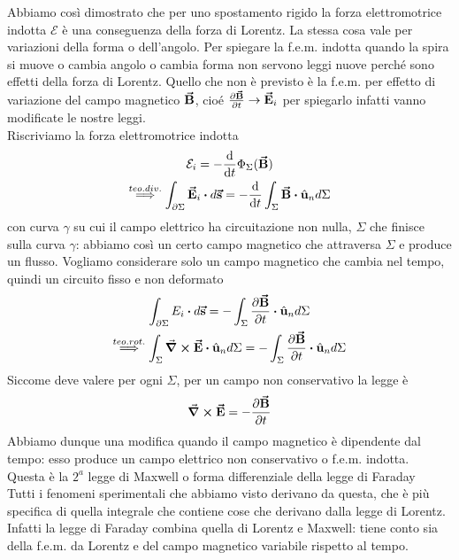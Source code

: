 Abbiamo così dimostrato che per uno spostamento rigido la forza elettromotrice indotta $\mathcal{E}$ è una conseguenza della forza di Lorentz. La stessa cosa vale per variazioni della forma o dell'angolo. Per spiegare la f.e.m. indotta quando la spira si muove o cambia angolo o cambia forma non servono leggi nuove perché sono effetti della forza di Lorentz. Quello che non è previsto è la f.e.m. per effetto di variazione del campo magnetico $\vb*{\va{B}}$, cioé $\pdv{\vb*{\va{B}}}{t}\rightarrow \vb*{\va{E}}_i$ per spiegarlo infatti vanno modificate le nostre leggi.\\
Riscriviamo la forza elettromotrice indotta
\begin{gather*}
	\mathcal{E}_i= -\dv{t}\Phi_\Sigma(\vba B)\\
	\stackrel{teo. div.}{\implies}\int_{\partial\Sigma}\vba E_i\vdot d\vba s=-\dv{t}\int_{\Sigma}\vba B\vdot\vbh u_n d\Sigma
\end{gather*}
con curva $\gamma$ su cui il campo elettrico ha circuitazione non nulla, $\Sigma$ che finisce sulla curva $\gamma$: abbiamo così un certo campo magnetico che attraversa $\Sigma$ e produce un flusso. Vogliamo considerare solo un campo magnetico che cambia nel tempo, quindi un circuito fisso e non deformato
\begin{gather*}
	\int_{\partial\Sigma} E_i\vdot d\vba s =-\int_\Sigma \pdv{\vba B}{t}\vdot\vbh u_n d\Sigma\\
	\stackrel{teo. rot.}{\implies}\int_\Sigma\curl\vba E\vdot\vbh{u}_n d\Sigma=-\int_{\Sigma}\pdv{\vba B}{t}\vdot\vbh u_n d\Sigma
\end{gather*}
Siccome deve valere per ogni $\Sigma$, per un campo non conservativo la legge è 
\begin{equation}
	\curl\vb*{\va{E}}=-\pdv{\vb*{\va{B}}}{t}
\end{equation}	
Abbiamo dunque una modifica quando il campo magnetico è dipendente dal tempo: esso produce un campo elettrico non conservativo o f.e.m. indotta.\\
Questa è la $2^a$ legge di Maxwell o forma differenziale della legge di Faraday\\
Tutti i fenomeni sperimentali che abbiamo visto derivano da questa, che è più specifica di quella integrale che contiene cose che derivano dalla legge di Lorentz. Infatti la legge di Faraday combina quella di Lorentz e Maxwell: tiene conto sia della f.e.m. da Lorentz e del campo magnetico variabile rispetto al tempo.\\

